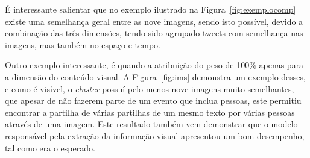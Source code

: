 É interessante salientar que no exemplo ilustrado na Figura~\ref{fig:exemplocomp} existe uma semelhança geral entre as nove imagens, sendo isto possível, devido a combinação das três dimensões, tendo sido agrupado tweets com semelhança nas imagens, mas também no espaço e tempo.


Outro exemplo interessante, é quando a atribuição do peso de 100\% apenas para a dimensão do conteúdo visual. A Figura~\ref{fig:ims} demonstra um exemplo desses, e como é visível, o \textit{cluster} possuí pelo menos nove imagens muito semelhantes, que apesar de não fazerem parte de um evento que inclua pessoas, este permitiu encontrar a partilha de várias partilhas de um mesmo texto por várias pessoas através de uma imagem. Este resultado também vem demonstrar que o modelo responsável pela extração da informação visual apresentou um bom desempenho, tal como era o esperado.

